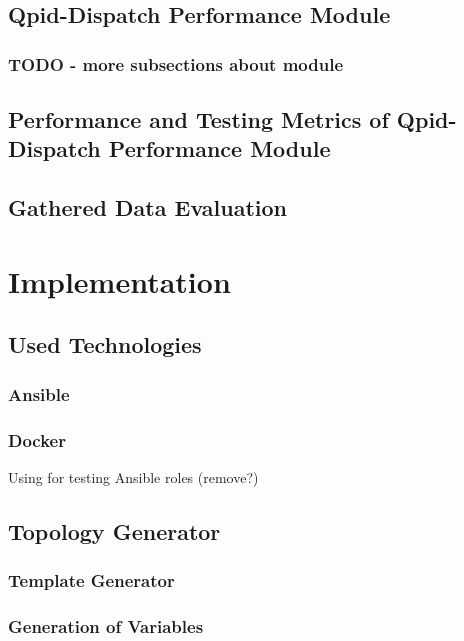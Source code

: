 \section{Qpid-Dispatch Performance Module}

\subsection{TODO - more subsections about module}

\section{Performance and Testing Metrics of Qpid-Dispatch Performance Module}

\section{Gathered Data Evaluation}

\chapter{Implementation}
\label{Implementation}

\section{Used Technologies}

\subsection{Ansible}

\subsection{Docker}
Using for testing Ansible roles (remove?)

\section{Topology Generator}

\subsection{Template Generator}

\subsection{Generation of Variables}

